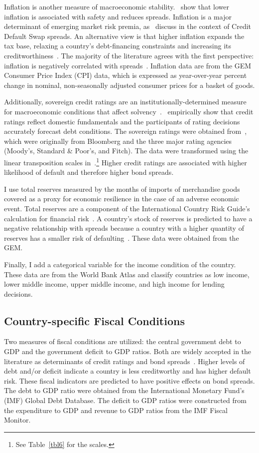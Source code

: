\documentclass[12pt]{article}
\begin{document}
Inflation is another measure of macroeconomic stability.~\textcite{cantor96} show that lower inflation is associated with safety and  reduces spreads. Inflation is a major determinant of emerging market risk premia, as~\textcite{aizenman13} discuss in the context of Credit Default Swap spreads. An alternative view is that higher inflation expands the tax base, relaxing a country's debt-financing constraints and increasing its creditworthiness~\parencite{nickel09}. The majority of the literature agrees with the first perspective:  inflation is negatively correlated with spreads~\parencite{eichengreen00}. Inflation data are from the GEM Consumer Price Index (CPI) data, which is expressed as year-over-year percent change in nominal, non-seasonally adjusted consumer prices for a basket of goods.

Additionally, sovereign credit ratings are an institutionally-determined measure for macroeconomic conditions that affect solvency~\parencite{cantor96}.~\textcite{ozmen16} empirically show that credit ratings reflect domestic fundamentals and the participants of rating decisions accurately forecast debt conditions. The sovereign ratings were obtained from~\parencite{emiru19}, which were originally from Bloomberg and the three major rating agencies (Moody's, Standard \& Poor's, and Fitch). The data were transformed using the linear transposition scales in~\parencite{bhatia02}.\footnote{See Table~\ref{tbl6} for the scales.} Higher credit ratings are associated with higher likelihood of default and therefore higher bond spreads.

I use total reserves measured by the months of imports of merchandise goods covered as a proxy for economic resilience in the case of an adverse economic event. Total reserves are a component of the International Country Risk Guide's calculation for financial risk~\parencite{comelli12}. A country's stock of reserves is predicted to have a negative relationship with spreads because a country with a higher quantity of reserves has a smaller risk of defaulting~\parencite{moghadam11}. These data were obtained from the GEM.

Finally, I add a categorical variable for the income condition of the country. These data are from the World Bank Atlas and classify countries as low income, lower middle income, upper middle income, and high income for lending decisions.
\subsection{Country-specific Fiscal Conditions}
Two measures of fiscal conditions are utilized: the central government debt to GDP and the government deficit to GDP ratios. Both are widely accepted in the literature as determinants of credit ratings and bond spreads~\parencite{capelli19,gruber12}. Higher levels of debt and/or deficit indicate a country is less creditworthy and has higher default risk. These fiscal indicators are predicted to have positive effects on bond spreads. The debt to GDP ratio were obtained from the International Monetary Fund's (IMF) Global Debt Database. The deficit to GDP ratios were constructed from the expenditure to GDP and revenue to GDP ratios from the IMF Fiscal Monitor.
\end{document}
